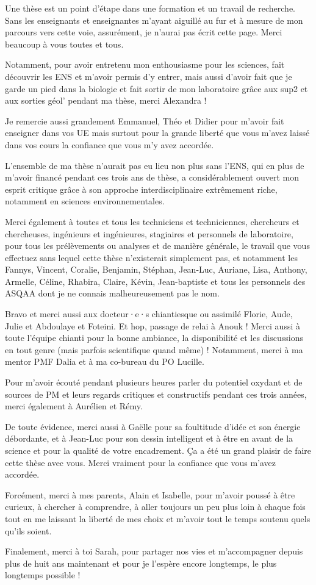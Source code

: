 
Une thèse est un point d'étape dans une formation et un travail de recherche.
Sans les enseignants et enseignantes m'ayant aiguillé au fur et à mesure de mon parcours
vers cette voie, assurément, je n'aurai pas écrit cette page. Merci beaucoup à vous
toutes et tous.

Notamment, pour avoir entretenu mon enthousiasme pour les sciences, fait découvrir les ENS
et m'avoir permis d'y entrer, mais aussi d'avoir fait que je garde un pied dans la
biologie et fait sortir de mon laboratoire grâce aux sup2 et aux sorties géol' pendant
ma thèse, merci Alexandra !

Je remercie aussi grandement Emmanuel, Théo et Didier pour m'avoir fait enseigner
dans vos UE mais surtout pour la grande liberté que vous m'avez laissé dans vos cours la
confiance que vous m'y avez accordée.

L'ensemble de ma thèse n'aurait pas eu lieu non plus sans l'ENS, qui en plus de m'avoir
financé pendant ces trois ans de thèse, a considérablement ouvert mon esprit critique
grâce à son approche interdisciplinaire extrêmement riche, notamment en sciences
environnementales.

Merci également à toutes et tous les techniciens et techniciennes, chercheurs et
chercheuses, ingénieurs et ingénieures, stagiaires et personnels de laboratoire, pour
tous les prélèvements ou analyses et de
manière générale, le travail que vous effectuez sans lequel cette thèse n'existerait
simplement pas, et notamment les Fannys, Vincent, Coralie, Benjamin, Stéphan, Jean-Luc,
Auriane, Lisa, Anthony, Armelle, Céline, Rhabira, Claire, Kévin, Jean-baptiste et tous
les personnels des ASQAA dont je ne connais malheureusement pas le nom.

Bravo et merci aussi aux docteur·e·s chiantiesque ou assimilé Florie, Aude, Julie et
Abdoulaye et Foteini. Et hop, passage de relai à Anouk !
Merci aussi à toute l'équipe chianti pour la bonne ambiance, la disponibilité et
les discussions en tout genre (mais parfois scientifique quand même) !
Notamment, merci à ma mentor PMF Dalia et à ma co-bureau du PO Lucille.

Pour m'avoir écouté pendant plusieurs heures parler du potentiel oxydant et de sources
de PM et leurs regards critiques et constructifs pendant ces trois années, merci
également à Aurélien et Rémy.

De toute évidence, merci aussi à Gaëlle pour sa foultitude d'idée et son énergie
débordante, et à Jean-Luc pour son dessin intelligent et à être en avant de la science et
pour la qualité de votre encadrement.
Ça a été un grand plaisir de faire cette thèse avec vous. Merci vraiment pour la
confiance que vous m'avez accordée.

Forcément, merci à mes parents, Alain et Isabelle, pour m'avoir poussé à être curieux, à
chercher à comprendre, à aller toujours un peu plus loin à chaque fois tout en me
laissant la liberté de mes choix et m'avoir tout le temps soutenu quels qu'ils soient.

Finalement, merci à toi Sarah, pour partager nos vies et m'accompagner depuis plus de
huit ans maintenant et pour je l'espère encore longtemps, le plus longtemps possible !



